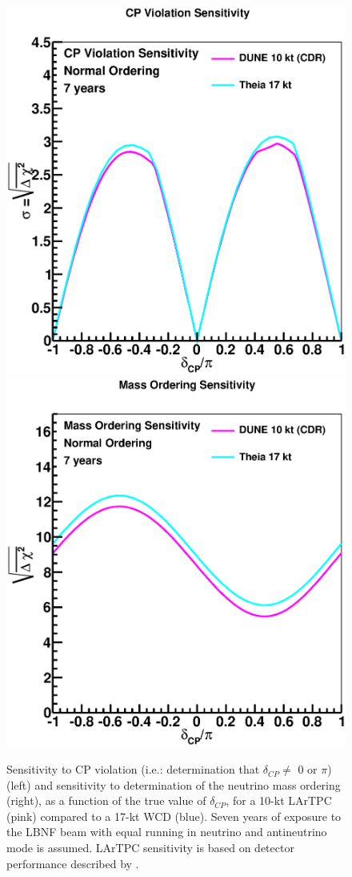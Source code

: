 \begin{figure}[h!]
  \centering
  \includegraphics[width=0.45\linewidth]{lbl/cpv_theia_17kt.eps}
  \includegraphics[width=0.45\linewidth]{lbl/mh_theia_17kt.eps}
  \caption{Sensitivity to CP violation (i.e.: determination that $\delta_{CP} \ne$ 0 or $\pi$) (left) and sensitivity
    to determination of the neutrino mass ordering (right), as a function of the true value of $\delta_{CP}$, for
    a 10-kt LArTPC (pink) compared to a 17-kt WCD (blue). Seven years of exposure to the LBNF beam
    with equal running in neutrino and antineutrino mode is assumed. LArTPC sensitivity is based on
    detector performance described by \cite{DUNEconfigs}.}
  \label{fig:lbl17kt}
\end{figure}

